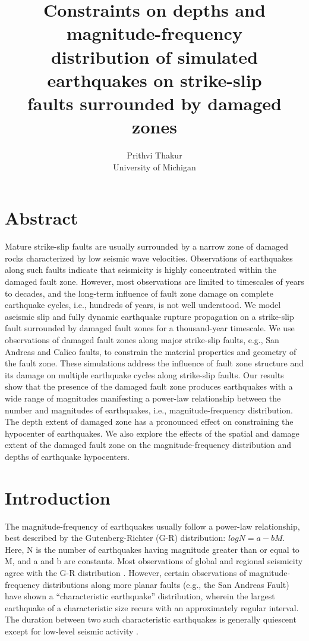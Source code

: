 \documentclass[11pt]{article}
\begin{document}
\title{Constraints on depths and magnitude-frequency \\\medskip distribution of simulated earthquakes on strike-slip \\\medskip faults surrounded by damaged zones}
\author{Prithvi Thakur\\University of Michigan}

\maketitle

\doublespacing
\section*{Abstract}
Mature strike-slip faults are usually surrounded by a narrow zone of damaged rocks characterized by low seismic wave velocities. Observations of earthquakes along such faults indicate that seismicity is highly concentrated within the damaged fault zone. However, most observations are limited to timescales of years to decades, and the long-term influence of fault zone damage on complete earthquake cycles, i.e., hundreds of years, is not well understood. We model aseismic slip and fully dynamic earthquake rupture propagation on a strike-slip fault surrounded by damaged fault zones for a thousand-year timescale. We use observations of damaged fault zones along major strike-slip faults, e.g., San Andreas and Calico faults, to constrain the material properties and geometry of the fault zone. These simulations address the influence of fault zone structure and its damage on multiple earthquake cycles along strike-slip faults. Our results show that the presence of the damaged fault zone produces earthquakes with a wide range of magnitudes manifesting a power-law relationship between the number and magnitudes of earthquakes, i.e., magnitude-frequency distribution. The depth extent of damaged zone has a pronounced effect on constraining the hypocenter of earthquakes. We also explore the effects of the spatial and damage extent of the damaged fault zone on the magnitude-frequency distribution and depths of earthquake hypocenters.

\section{Introduction}
The magnitude-frequency of earthquakes usually follow a power-law relationship, best described by the Gutenberg-Richter (G-R) distribution: $logN = a - bM$. Here, N is the number of earthquakes having magnitude greater than or equal to M, and a and b are constants. Most observations of global and regional seismicity agree with the G-R distribution \citep{page_felzer_2015, rundle_1989}. However, certain observations of magnitude-frequency distributions along more planar faults (e.g., the San Andreas Fault) have shown a “characteristic earthquake” distribution, wherein the largest earthquake of a characteristic size recurs with an approximately regular interval. The duration between two such characteristic earthquakes is generally quiescent except for low-level seismic activity \citep{schwartz_coppersmith_1984, wesnousky_1994}. 
\end{document}

